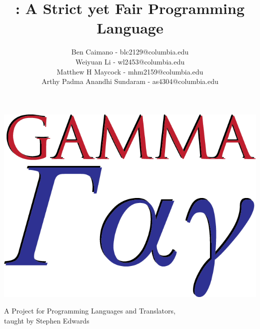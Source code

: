 \documentclass[10pt]{article}
\title{\Lang{}: A Strict yet Fair Programming Language}
\author{
	Ben Caimano - blc2129@columbia.edu \\
	Weiyuan Li - wl2453@columbia.edu \\
	Matthew H Maycock - mhm2159@columbia.edu \\
	Arthy Padma Anandhi Sundaram - as4304@columbia.edu
}
\date{}
\begin{document}
\noindent\includegraphics[width=\textwidth]{logo.png}
\pagebreak

\maketitle
\begin{center}
\large
A Project for Programming Languages and Translators,
\\taught by Stephen Edwards
\end{center}



\pagebreak

\tableofcontents











%
\end{document}
